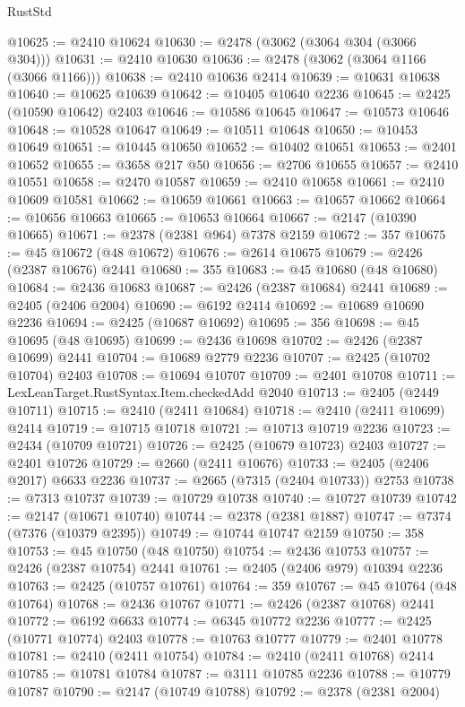 \begin{lexlean}{RustStd}
\begin{coremodule}
@10625 := @2410 @10624
@10630 := @2478 (@3062 (@3064 @304 (@3066 @304)))
@10631 := @2410 @10630
@10636 := @2478 (@3062 (@3064 @1166 (@3066 @1166)))
@10638 := @2410 @10636 @2414
@10639 := @10631 @10638
@10640 := @10625 @10639
@10642 := @10405 @10640 @2236
@10645 := @2425 (@10590 @10642) @2403
@10646 := @10586 @10645
@10647 := @10573 @10646
@10648 := @10528 @10647
@10649 := @10511 @10648
@10650 := @10453 @10649
@10651 := @10445 @10650
@10652 := @10402 @10651
@10653 := @2401 @10652
@10655 := @3658 @217 @50
@10656 := @2706 @10655
@10657 := @2410 @10551
@10658 := @2470 @10587
@10659 := @2410 @10658
@10661 := @2410 @10609 @10581
@10662 := @10659 @10661
@10663 := @10657 @10662
@10664 := @10656 @10663
@10665 := @10653 @10664
@10667 := @2147 (@10390 @10665)
@10671 := @2378 (@2381 @964) @7378 @2159
@10672 := 357
@10675 := @45 @10672 (@48 @10672)
@10676 := @2614 @10675
@10679 := @2426 (@2387 @10676) @2441
@10680 := 355
@10683 := @45 @10680 (@48 @10680)
@10684 := @2436 @10683
@10687 := @2426 (@2387 @10684) @2441
@10689 := @2405 (@2406 @2004)
@10690 := @6192 @2414
@10692 := @10689 @10690 @2236
@10694 := @2425 (@10687 @10692)
@10695 := 356
@10698 := @45 @10695 (@48 @10695)
@10699 := @2436 @10698
@10702 := @2426 (@2387 @10699) @2441
@10704 := @10689 @2779 @2236
@10707 := @2425 (@10702 @10704) @2403
@10708 := @10694 @10707
@10709 := @2401 @10708
@10711 := LexLeanTarget.RustSyntax.Item.checkedAdd @2040
@10713 := @2405 (@2449 @10711)
@10715 := @2410 (@2411 @10684)
@10718 := @2410 (@2411 @10699) @2414
@10719 := @10715 @10718
@10721 := @10713 @10719 @2236
@10723 := @2434 (@10709 @10721)
@10726 := @2425 (@10679 @10723) @2403
@10727 := @2401 @10726
@10729 := @2660 (@2411 @10676)
@10733 := @2405 (@2406 @2017) @6633 @2236
@10737 := @2665 (@7315 (@2404 @10733)) @2753
@10738 := @7313 @10737
@10739 := @10729 @10738
@10740 := @10727 @10739
@10742 := @2147 (@10671 @10740)
@10744 := @2378 (@2381 @1887)
@10747 := @7374 (@7376 (@10379 @2395))
@10749 := @10744 @10747 @2159
@10750 := 358
@10753 := @45 @10750 (@48 @10750)
@10754 := @2436 @10753
@10757 := @2426 (@2387 @10754) @2441
@10761 := @2405 (@2406 @979) @10394 @2236
@10763 := @2425 (@10757 @10761)
@10764 := 359
@10767 := @45 @10764 (@48 @10764)
@10768 := @2436 @10767
@10771 := @2426 (@2387 @10768) @2441
@10772 := @6192 @6633
@10774 := @6345 @10772 @2236
@10777 := @2425 (@10771 @10774) @2403
@10778 := @10763 @10777
@10779 := @2401 @10778
@10781 := @2410 (@2411 @10754)
@10784 := @2410 (@2411 @10768) @2414
@10785 := @10781 @10784
@10787 := @3111 @10785 @2236
@10788 := @10779 @10787
@10790 := @2147 (@10749 @10788)
@10792 := @2378 (@2381 @2004)

\end{coremodule}
\end{lexlean}
